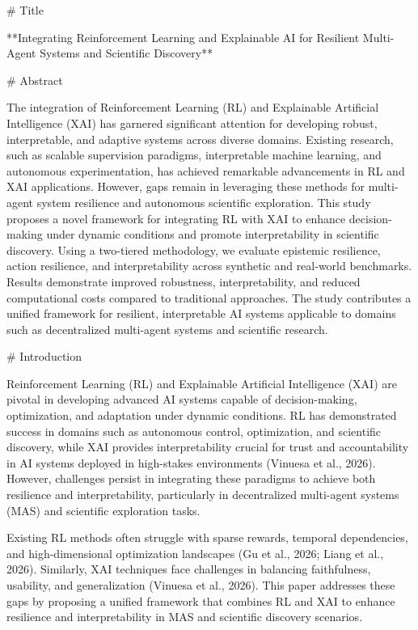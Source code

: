 # Title

**Integrating Reinforcement Learning and Explainable AI for Resilient Multi-Agent Systems and Scientific Discovery**

# Abstract

The integration of Reinforcement Learning (RL) and Explainable Artificial Intelligence (XAI) has garnered significant attention for developing robust, interpretable, and adaptive systems across diverse domains. Existing research, such as scalable supervision paradigms, interpretable machine learning, and autonomous experimentation, has achieved remarkable advancements in RL and XAI applications. However, gaps remain in leveraging these methods for multi-agent system resilience and autonomous scientific exploration. This study proposes a novel framework for integrating RL with XAI to enhance decision-making under dynamic conditions and promote interpretability in scientific discovery. Using a two-tiered methodology, we evaluate epistemic resilience, action resilience, and interpretability across synthetic and real-world benchmarks. Results demonstrate improved robustness, interpretability, and reduced computational costs compared to traditional approaches. The study contributes a unified framework for resilient, interpretable AI systems applicable to domains such as decentralized multi-agent systems and scientific research.

# Introduction

Reinforcement Learning (RL) and Explainable Artificial Intelligence (XAI) are pivotal in developing advanced AI systems capable of decision-making, optimization, and adaptation under dynamic conditions. RL has demonstrated success in domains such as autonomous control, optimization, and scientific discovery, while XAI provides interpretability crucial for trust and accountability in AI systems deployed in high-stakes environments (Vinuesa et al., 2026). However, challenges persist in integrating these paradigms to achieve both resilience and interpretability, particularly in decentralized multi-agent systems (MAS) and scientific exploration tasks.

Existing RL methods often struggle with sparse rewards, temporal dependencies, and high-dimensional optimization landscapes (Gu et al., 2026; Liang et al., 2026). Similarly, XAI techniques face challenges in balancing faithfulness, usability, and generalization (Vinuesa et al., 2026). This paper addresses these gaps by proposing a unified framework that combines RL and XAI to enhance resilience and interpretability in MAS and scientific discovery scenarios.

